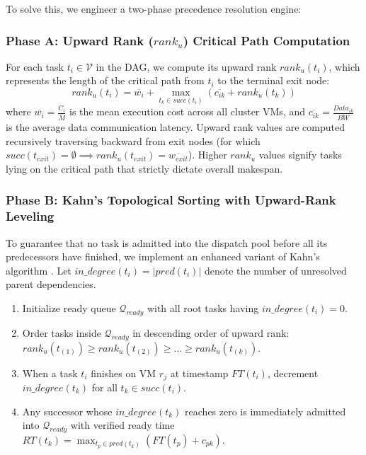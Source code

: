 \documentclass[default,sn-mathphys-num]{sn-jnl}
\theoremstyle{thmstyleone}
\theoremstyle{thmstyletwo}
\theoremstyle{thmstylethree}
\begin{document}
To solve this, we engineer a two-phase precedence resolution engine:

\subsubsection{Phase A: Upward Rank ($rank_u$) Critical Path Computation}
For each task $t_i \in \mathcal{V}$ in the DAG, we compute its upward rank $rank_u(t_i)$, which represents the length of the critical path from $t_i$ to the terminal exit node:
\begin{equation}\label{eq:rank_u}
rank_u(t_i) = \overline{w_i} + \max_{t_k \in succ(t_i)} \left( \overline{c_{ik}} + rank_u(t_k) \right)
\end{equation}
where $\overline{w_i} = \frac{C_i}{\overline{M}}$ is the mean execution cost across all cluster VMs, and $\overline{c_{ik}} = \frac{Data_{ik}}{\overline{BW}}$ is the average data communication latency. Upward rank values are computed recursively traversing backward from exit nodes (for which $succ(t_{exit}) = \emptyset \implies rank_u(t_{exit}) = \overline{w_{exit}}$). Higher $rank_u$ values signify tasks lying on the critical path that strictly dictate overall makespan.

\subsubsection{Phase B: Kahn's Topological Sorting with Upward-Rank Leveling}
To guarantee that no task is admitted into the dispatch pool before all its predecessors have finished, we implement an enhanced variant of Kahn's algorithm \cite{kahn1962topological}. Let $in\_degree(t_i) = |pred(t_i)|$ denote the number of unresolved parent dependencies. 
\begin{enumerate}
    \item Initialize ready queue $\mathcal{Q}_{ready}$ with all root tasks having $in\_degree(t_i) = 0$.
    \item Order tasks inside $\mathcal{Q}_{ready}$ in descending order of upward rank: $rank_u(t_{(1)}) \ge rank_u(t_{(2)}) \ge \dots \ge rank_u(t_{(k)})$.
    \item When a task $t_i$ finishes on VM $r_j$ at timestamp $FT(t_i)$, decrement $in\_degree(t_k)$ for all $t_k \in succ(t_i)$.
    \item Any successor whose $in\_degree(t_k)$ reaches zero is immediately admitted into $\mathcal{Q}_{ready}$ with verified ready time $RT(t_k) = \max_{t_p \in pred(t_k)} \left( FT(t_p) + c_{pk} \right)$.
\end{enumerate}
\end{document}
